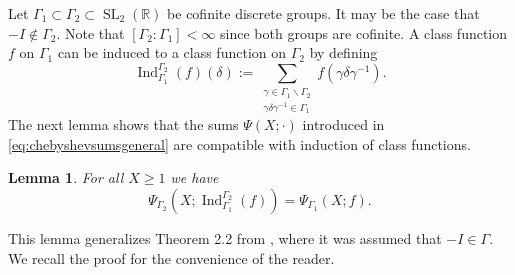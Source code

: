 \documentclass{article}
\newtheorem{lem}[thm]{Lemma}
\theoremstyle{named}
\newcommand{\R}{\mathbb{R}}
\DeclareMathOperator{\SL}{SL}
\DeclareMathOperator{\Ind}{Ind}
\begin{document}
Let $\Gamma_1 \subset \Gamma_2 \subset \SL_2(\R)$ be cofinite discrete groups. It may be the case that $-I \notin \Gamma_2$. Note that $[\Gamma_2 : \Gamma_1] < \infty$ since both groups are cofinite. A class function $f$ on $\Gamma_1$ can be induced to a class function on $\Gamma_2$ by defining
\begin{equation*}
    \Ind_{\Gamma_1}^{\Gamma_2}(f)(\delta) := \sum_{\substack{\gamma \in \Gamma_1 \backslash \Gamma_2\\\gamma \delta \gamma^{-1} \in \Gamma_1}}f(\gamma \delta \gamma^{-1}).
\end{equation*}
The next lemma shows that the sums $\Psi(X; \cdot)$ introduced in \eqref{eq:chebyshevsumsgeneral} are compatible with induction of class functions.
\begin{lem}\label{lem:compatibilitywithinduction}
For all $X\geq 1$ we have 
\begin{equation}\label{eq:compatibilitywithinduction}
\Psi_{\Gamma_2}(X; \Ind_{\Gamma_1}^{\Gamma_2}(f)) = \Psi_{\Gamma_1}(X; f).
\end{equation}
\end{lem}
This lemma generalizes Theorem 2.2 from \cite{venkov}, where it was assumed that $-I \in \Gamma$. We recall the proof for the convenience of the reader. 
\end{document}
